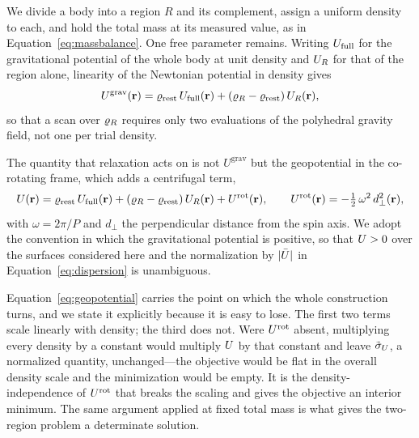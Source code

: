 We divide a body into a region $R$ and its complement, assign a uniform
density to each, and hold the total mass at its measured value, as in
Equation~\eqref{eq:massbalance}. One free parameter remains. Writing
$U_{\mathrm{full}}$ for the gravitational potential of the whole body at unit
density and $U_{R}$ for that of the region alone, linearity of the
Newtonian potential in density gives
%
\begin{equation}
U^{\mathrm{grav}}(\mathbf{r})
  = \varrho_{\mathrm{rest}}\,U_{\mathrm{full}}(\mathbf{r})
  + \left(\varrho_{R} - \varrho_{\mathrm{rest}}\right)U_{R}(\mathbf{r}) ,
\label{eq:superposition}
\end{equation}
%
so that a scan over $\varrho_{R}$ requires only two evaluations of the
polyhedral gravity field, not one per trial density.

The quantity that relaxation acts on is not $U^{\mathrm{grav}}$ but the
geopotential in the co-rotating frame, which adds a centrifugal term,
%
\begin{equation}
U(\mathbf{r})
  = \varrho_{\mathrm{rest}}\,U_{\mathrm{full}}(\mathbf{r})
  + \left(\varrho_{R} - \varrho_{\mathrm{rest}}\right)U_{R}(\mathbf{r})
  + U^{\mathrm{rot}}(\mathbf{r}) ,
\qquad
U^{\mathrm{rot}}(\mathbf{r}) = -\tfrac{1}{2}\,\omega^{2}\,d_{\perp}^{2}(\mathbf{r}) ,
\label{eq:geopotential}
\end{equation}
%
with $\omega = 2\pi/P$ and $d_{\perp}$ the perpendicular distance from
the spin axis. We adopt the convention in which the gravitational
potential is positive, so that $U > 0$ over the surfaces considered
here and the normalization by $\lvert\bar{U}\rvert$ in
Equation~\eqref{eq:dispersion} is unambiguous.

Equation~\eqref{eq:geopotential} carries the point on which the whole
construction turns, and we state it explicitly because it is easy to
lose. The first two terms scale linearly with density; the third does
not. Were $U^{\mathrm{rot}}$ absent, multiplying every density by a constant would
multiply $U$ by that constant and leave $\tilde{\sigma}_{U}$, a normalized
quantity, unchanged---the objective would be flat in the overall density
scale and the minimization would be empty. It is the
density-independence of $U^{\mathrm{rot}}$ that breaks the scaling and gives the
objective an interior minimum. The same argument applied at fixed total
mass is what gives the two-region problem a determinate solution.

